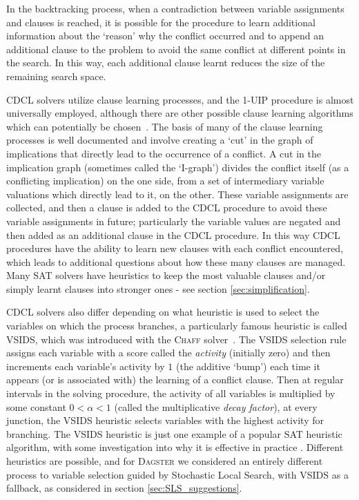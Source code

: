 \documentclass[
10pt, %
a4paper, %
oneside, %
headinclude,footinclude, %
BCOR5mm, %
]{scrartcl}
\begin{document}
In the backtracking process, when a contradiction between variable assignments and clauses is reached, it is possible for the procedure to learn additional information about the `reason' why the conflict occurred and to append an additional clause to the problem to avoid the same conflict at different points in the search.
In this way, each additional clause learnt reduces the size of the remaining search space.

CDCL solvers utilize clause learning processes, and the 1-UIP procedure is almost universally employed, although there are other possible clause learning algorithms which can potentially be chosen~\cite{10.1007/978-3-030-51825-7_3,968634}.
The basis of many of the clause learning processes is well documented and involve creating a `cut' in the graph of implications that directly lead to the occurrence of a conflict.
A cut in the implication graph (sometimes called the `I-graph') divides the conflict itself (as a conflicting implication) on the one side, 
from a set of intermediary variable valuations which directly lead to it, on the other.
These variable assignments are collected, and then a clause is added to the CDCL procedure to avoid these variable assignments in future; particularly the variable values are negated and then added as an additional clause in the CDCL procedure.
In this way CDCL procedures have the ability to learn new clauses with each conflict encountered, which leads to additional questions about how these many clauses are managed. Many SAT solvers have heuristics to keep the most valuable clauses and/or simply learnt clauses into stronger ones - see section \ref{sec:simplification}.

CDCL solvers also differ depending on what heuristic is used to select the variables on which the process branches,
 a particularly famous heuristic is called VSIDS, which was introduced with the \textsc{Chaff} solver~\cite{10.1145/378239.379017}.
The VSIDS selection rule assigns each variable with a score called the \textit{activity} (initially zero) and then increments each variable's activity by $1$ (the additive `bump') each time it appears (or is associated with) the learning of a conflict clause.
Then at regular intervals in the solving procedure, the activity of all variables is multiplied by some constant $0<\alpha<1$ (called the multiplicative \textit{decay factor}), at every junction, the VSIDS heuristic selects variables with the highest activity for branching.
The VSIDS heuristic is just one example of a popular SAT heuristic algorithm, with some investigation into why it is effective in practice \cite{liang2015understanding}.
Different heuristics are possible, and for \textsc{Dagster} we considered an entirely different process to variable selection guided by Stochastic Local Search, with VSIDS
as a fallback, as considered in section \ref{sec:SLS_suggestions}.
\end{document}
